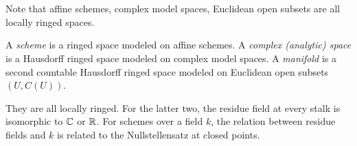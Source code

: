 \documentclass{../../large}
\begin{document}
\section{}

Note that affine schemes, complex model spaces, Euclidean open subsets are all locally ringed spaces.

A \emph{scheme} is a ringed space modeled on affine schemes.
A \emph{complex (analytic) space} is a Hausdorff ringed space modeled on complex model spaces.
A \emph{manifold} is a second countable Hausdorff ringed space modeled on Euclidean open subsets $(U,C(U))$.

They are all locally ringed.
For the latter two, the residue field at every stalk is isomorphic to $\mathbb{C}$ or $\mathbb{R}$.
For schemes over a field $k$, the relation between residue fields and $k$ is related to the Nullstellensatz at closed points.


\section{}
\end{document}
